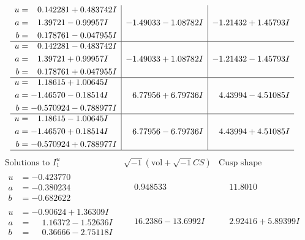 \documentclass[1p]{elsarticle_modified}
\theoremstyle{definition}
\newcommand{\I}{\sqrt{-1}}
\begin{document}
$$\begin{array}{c|c|c}
\begin{aligned}
u &= \phantom{-}0.142281 + 0.483742 I \\
a &= \phantom{-}1.39721 - 0.99957 I \\
b &= \phantom{-}0.178761 - 0.047955 I\end{aligned}
 & -1.49033 - 1.08782 I & -1.21432 + 1.45793 I \\ \hline\begin{aligned}
u &= \phantom{-}0.142281 - 0.483742 I \\
a &= \phantom{-}1.39721 + 0.99957 I \\
b &= \phantom{-}0.178761 + 0.047955 I\end{aligned}
 & -1.49033 + 1.08782 I & -1.21432 - 1.45793 I \\ \hline\begin{aligned}
u &= \phantom{-}1.18615 + 1.00645 I \\
a &= -1.46570 - 0.18514 I \\
b &= -0.570924 - 0.788977 I\end{aligned}
 & \phantom{-}6.77956 + 6.79736 I & \phantom{-}4.43994 - 4.51085 I \\ \hline\begin{aligned}
u &= \phantom{-}1.18615 - 1.00645 I \\
a &= -1.46570 + 0.18514 I \\
b &= -0.570924 + 0.788977 I\end{aligned}
 & \phantom{-}6.77956 - 6.79736 I & \phantom{-}4.43994 + 4.51085 I\\
 \hline 
 \end{array}$$\newpage$$\begin{array}{c|c|c}  
\text{Solutions to }I^u_{1}& \I (\text{vol} + \sqrt{-1}CS) & \text{Cusp shape}\\
 \hline 
\begin{aligned}
u &= -0.423770\phantom{ +0.000000I} \\
a &= -0.380234\phantom{ +0.000000I} \\
b &= -0.682622\phantom{ +0.000000I}\end{aligned}
 & \phantom{-}0.948533\phantom{ +0.000000I} & \phantom{-}11.8010\phantom{ +0.000000I} \\ \hline\begin{aligned}
u &= -0.90624 + 1.36309 I \\
a &= \phantom{-}1.16372 - 1.52636 I \\
b &= \phantom{-}0.36666 - 2.75118 I\end{aligned}
 & \phantom{-}16.2386 - 13.6992 I & \phantom{-}2.92416 + 5.89399 I \\ \hline\begin{aligned}

\end{aligned}
\end{array}$$
\end{document}
